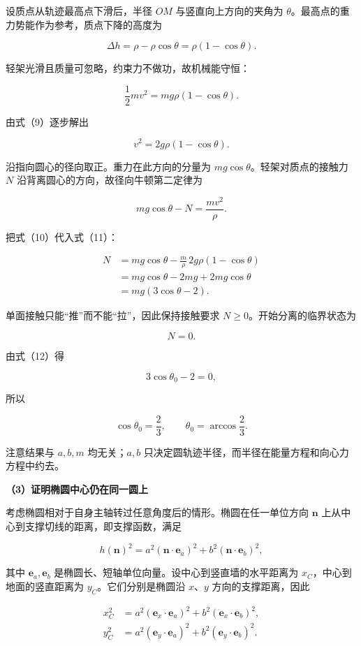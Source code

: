 \documentclass[12pt,a4paper,UTF8]{ctexart}
\begin{document}
设质点从轨迹最高点下滑后，半径 \(OM\) 与竖直向上方向的夹角为
\(\theta\)。最高点的重力势能作为参考，质点下降的高度为

\[\Delta h=\rho-\rho\cos\theta=\rho(1-\cos\theta).\]

轻架光滑且质量可忽略，约束力不做功，故机械能守恒：

\[\frac12mv^2=mg\rho(1-\cos\theta).\]

由式（9）逐步解出

\[v^2=2g\rho(1-\cos\theta).\]

沿指向圆心的径向取正。重力在此方向的分量为
\(mg\cos\theta\)。轻架对质点的接触力 \(N\)
沿背离圆心的方向，故径向牛顿第二定律为

\[mg\cos\theta-N=\frac{mv^2}{\rho}.\]

把式（10）代入式（11）：

\[\begin{aligned}
N
&=mg\cos\theta-\frac{m}{\rho}\,2g\rho(1-\cos\theta)\\
&=mg\cos\theta-2mg+2mg\cos\theta\\
&=mg(3\cos\theta-2).
\end{aligned}\]

单面接触只能``推''而不能``拉''，因此保持接触要求
\(N\geq0\)。开始分离的临界状态为

\[N=0.\]

由式（12）得

\[3\cos\theta_0-2=0,\]

所以

\[\boxed{\cos\theta_0=\frac23},\qquad
\boxed{\theta_0=\arccos\frac23}.\]

注意结果与 \(a,b,m\) 均无关；\(a,b\)
只决定圆轨迹半径，而半径在能量方程和向心力方程中约去。

\textbf{（3）证明椭圆中心仍在同一圆上}

考虑椭圆相对于自身主轴转过任意角度后的情形。椭圆在任一单位方向 \(\bm n\)
上从中心到支撑切线的距离，即支撑函数，满足

\[h(\bm n)^2=a^2(\bm n\cdot\bm e_a)^2+b^2(\bm n\cdot\bm e_b)^2,\]

其中 \(\bm e_a,\bm e_b\)
是椭圆长、短轴单位向量。设中心到竖直墙的水平距离为
\(x_C\)，中心到地面的竖直距离为 \(y_C\)。它们分别是椭圆沿 \(x\)、\(y\)
方向的支撑距离，因此

\[\begin{aligned}
x_C^2&=a^2(\bm e_x\cdot\bm e_a)^2+b^2(\bm e_x\cdot\bm e_b)^2,\\
y_C^2&=a^2(\bm e_y\cdot\bm e_a)^2+b^2(\bm e_y\cdot\bm e_b)^2.
\end{aligned}\]
\end{document}
